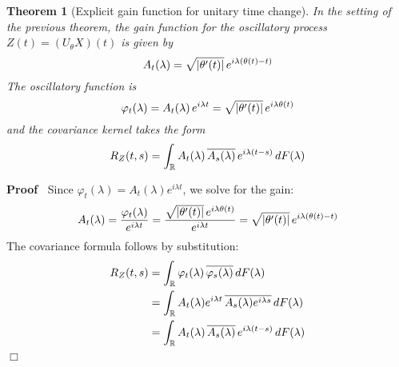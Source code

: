 \documentclass{article}
\newenvironment{proof}{\noindent\textbf{Proof\ }}{\hspace*{\fill}$\Box$\medskip}
\newtheorem{theorem}{Theorem}
\begin{document}
\begin{theorem}
  [Explicit gain function for unitary time change] In the setting of the previous theorem, the gain function for the oscillatory process $Z(t) = (U_{\theta} X)(t)$ is given by
  \begin{equation}
    A_t(\lambda) = \sqrt{|\theta'(t)|} \hspace{0.17em} e^{i \lambda (\theta(t) - t)}
  \end{equation}
  The oscillatory function is
  \begin{equation}
    \varphi_t(\lambda) = A_t(\lambda) \hspace{0.17em} e^{i \lambda t} = \sqrt{|\theta'(t)|} \hspace{0.17em} e^{i \lambda \theta(t)}
  \end{equation}
  and the covariance kernel takes the form
  \begin{equation}
    R_Z(t,s) = \int_{\mathbb{R}} A_t(\lambda) \hspace{0.17em} \overline{A_s(\lambda)} \hspace{0.17em} e^{i \lambda (t-s)} \hspace{0.17em} dF(\lambda)
  \end{equation}
\end{theorem}

\begin{proof}
  Since $\varphi_t(\lambda) = A_t(\lambda) e^{i \lambda t}$, we solve for the gain:
  \begin{equation}
    A_t(\lambda) = \frac{\varphi_t(\lambda)}{e^{i \lambda t}} = \frac{\sqrt{|\theta'(t)|} \hspace{0.17em} e^{i \lambda \theta(t)}}{e^{i \lambda t}} = \sqrt{|\theta'(t)|} \hspace{0.17em} e^{i \lambda (\theta(t) - t)}
  \end{equation}
  The covariance formula follows by substitution:
  \begin{align}
    R_Z(t,s) &= \int_{\mathbb{R}} \varphi_t(\lambda) \hspace{0.17em} \overline{\varphi_s(\lambda)} \hspace{0.17em} dF(\lambda) \\
    &= \int_{\mathbb{R}} A_t(\lambda) e^{i \lambda t} \hspace{0.17em} \overline{A_s(\lambda) e^{i \lambda s}} \hspace{0.17em} dF(\lambda) \\
    &= \int_{\mathbb{R}} A_t(\lambda) \hspace{0.17em} \overline{A_s(\lambda)} \hspace{0.17em} e^{i \lambda (t-s)} \hspace{0.17em} dF(\lambda)
  \end{align}
\end{proof}
\end{document}
